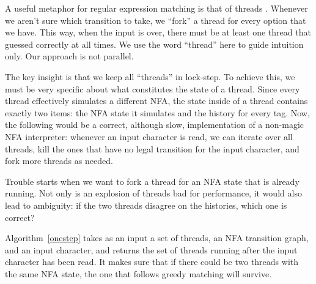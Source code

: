 \documentclass[english]{sigplanconf}
\theoremstyle{definition}
\begin{document}
A useful metaphor for regular expression matching is that of threads
\cite{Cox07a}. Whenever we aren't sure which transition to take,
we ``fork'' a thread for every option that we have. This way, when
the input is over, there must be at least one thread that guessed
correctly at all times. We use the word ``thread'' here to guide
intuition only. Our approach is not parallel. 

The key insight is that we keep all ``threads'' in lock-step. To
achieve this, we must be very specific about what constitutes the
state of a thread. Since every thread effectively simulates a different
NFA, the state inside of a thread contains exactly two items: the
NFA state it simulates and the history for every tag. Now, the following
would be a correct, although slow, implementation of a non-magic NFA
interpreter: whenever an input character is read, we can iterate over
all threads, kill the ones that have no legal transition for the input
character, and fork more threads as needed.

Trouble starts when we want to fork a thread for an NFA state that
is already running. Not only is an explosion of threads bad for
performance, it would also lead to ambiguity: if the two threads
disagree on the histories, which one is correct?



Algorithm~\ref{onestep}  takes as an input a set of threads, an NFA
transition graph, and an input character, and returns the set of threads
running after the input character has been read. It makes sure that
if there could be two threads with the same NFA state, the one that
follows greedy matching will survive.
\end{document}
